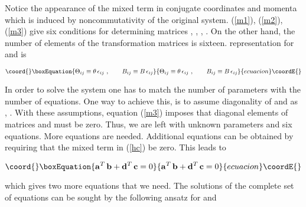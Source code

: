 \documentclass[a4paper,aps,prd,preprint]{revtex4}
\begin{document}
Notice the appearance of the mixed term in conjugate coordinates and momenta
 which
is induced by  noncommutativity of the original system. 
   (\ref{m1}), (\ref{m2}), (\ref{m3}) give six conditions for determining
   matrices     \coordHE{},  \coordHE{},  \coordHE{}, \coordHE{}.
 On the other hand, the number of elements of the transformation matrices is 
 sixteen. \coordHE{} representation for \myHighlight{${\bf \Theta}$}\coordHE{} and \coordHE{} is
  
   \begin{equation}\coord{}\boxEquation{
   \Theta_{ij}\equiv \theta\, \epsilon_{ij}\ ,\qquad
    B_{ij}\equiv B\, \epsilon_{ij}
   }{
   \Theta_{ij}\equiv \theta\, \epsilon_{ij}\ ,\qquad
    B_{ij}\equiv B\, \epsilon_{ij}
   }{ecuacion}\coordE{}\end{equation}
   
   In order to solve the system one has to 
   match the number of parameters with the number of equations. One way
   to achieve this, is to assume diagonality of \coordHE{} and \coordHE{} as
   \coordHE{},  
   \coordHE{}. With these assumptions,
    equation (\ref{m3}) imposes that diagonal elements of  matrices 
    \coordHE{} and  \coordHE{} must be zero.  Thus,  we are left with
   \coordHE{} unknown parameters and six equations.  More equations are 
   needed. Additional equations can be obtained by requiring that the mixed 
   term in (\ref{hc}) be zero. This leads to
   
   \begin{equation}\coord{}\boxEquation{
   {\bf a}^T \, {\bf b} + {\bf d}^T\, {\bf c}=0\label{mixed}
   }{
   {\bf a}^T \, {\bf b} + {\bf d}^T\, {\bf c}=0}{ecuacion}\coordE{}\end{equation}
   
   which gives  two more equations that we need. 
   The solutions of the complete set of equations can be sought by 
   the following ansatz for \coordHE{} and \coordHE{} 
   
\end{document}
